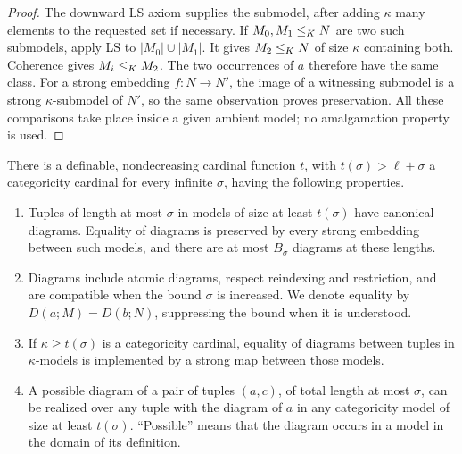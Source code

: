 \begin{proof}
The downward LS axiom supplies the submodel, after adding
\(\kappa\) many elements to the requested set if necessary. If
\(M_0,M_1\le_K N\) are two such submodels, apply LS to
\(|M_0|\cup|M_1|\). It gives \(M_2\le_K N\) of size \(\kappa\)
containing both. Coherence gives \(M_i\le_K M_2\). The two occurrences
of \(a\) therefore have the same class. For a strong embedding
\(f:N\to N'\), the image of a witnessing submodel is a strong
\(\kappa\)-submodel of \(N'\), so the same observation proves
preservation. All these comparisons take place inside a given ambient
model; no amalgamation property is used.
\end{proof}

\begin{proposition}
\label{lev:stabilization}
There is a definable, nondecreasing cardinal function \(t\), with
\(t(\sigma)>\ell+\sigma\) a categoricity cardinal for every infinite
\(\sigma\), having the following properties.
\begin{enumerate}
\item Tuples of length at most \(\sigma\) in models of size at least
\(t(\sigma)\) have canonical diagrams. Equality of diagrams is
preserved by every strong embedding between such models, and there
are at most \(B_\sigma\) diagrams at these lengths.
\item Diagrams include atomic diagrams, respect reindexing and
restriction, and are compatible when the bound \(\sigma\) is
increased. We denote equality by \(D(a;M)=D(b;N)\), suppressing the
bound when it is understood.
\item If \(\kappa\ge t(\sigma)\) is a categoricity cardinal, equality
of diagrams between tuples in \(\kappa\)-models is implemented by
a strong map between those models.
\item A possible diagram of a pair of tuples \((a,c)\), of total
length at most \(\sigma\), can be realized over any tuple with the
diagram of \(a\) in any categoricity model of size at least
\(t(\sigma)\). ``Possible'' means that the diagram occurs in a
model in the domain of its definition.
\end{enumerate}
\end{proposition}

